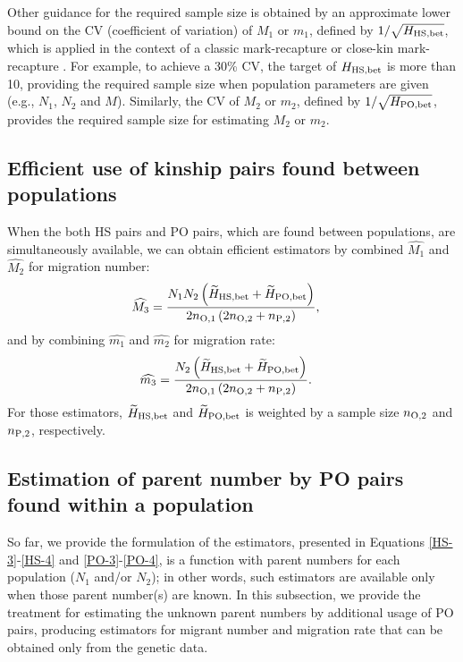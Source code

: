 \documentclass[12pt, English]{article}
\begin{document}
\begin{spacing}{1.9}
Other guidance for the required sample size is obtained by an approximate lower bound on the CV (coefficient of variation) of $M_1$ or $m_1$, defined by $1/\sqrt{H_{\rm HS, bet}}$, which is applied in the context of a classic mark-recapture \cite[]{seber1982estimation} or close-kin mark-recapture \cite[]{bravington2016close}. For example, to achieve a 30\% CV, the target of $H_{\rm HS, bet}$ is more than 10, providing the required sample size when population parameters are given (e.g., $N_1$, $N_2$ and $M$). Similarly, the CV of $M_2$ or $m_2$, defined by $1/\sqrt{H_{\rm PO, bet}}$, provides the required sample size for estimating $M_2$ or $m_2$. 

\subsection{Efficient use of kinship pairs found between populations}

When the both HS pairs and PO pairs, which are found between populations, are simultaneously available, we can obtain efficient estimators by combined $\widehat{M_1}$ and $\widehat{M_2}$ for migration number: 
\begin{align}
\widehat{M_3} &= \frac{ N_{1} N_{2} \left(\widetilde{H}_{\rm HS,bet} + \widetilde{H}_{\rm PO,bet}\right) } {2n_{\rm O, 1} \left(2 n_{\rm O, 2} + n_{\rm P, 2}\right) },
\label{AP-1}
\end{align}
and by combining $\widehat{m_1}$ and $\widehat{m_2}$ for migration rate: 
\begin{align}
\widehat{m_3} &= \frac{ N_{2} \left(\widetilde{H}_{\rm HS,bet} + \widetilde{H}_{\rm PO,bet}\right) } {2n_{\rm O, 1} \left(2 n_{\rm O, 2} + n_{\rm P, 2}\right)}.
\label{AP-2}
\end{align}
For those estimators, $\widetilde{H}_{\rm HS,bet}$ and $\widetilde{H}_{\rm PO,bet}$ is weighted by a sample size $n_{\rm O, 2}$ and $n_{\rm P, 2}$, respectively. 

\subsection{Estimation of parent number by PO pairs found within a population}

So far, we provide the formulation of the estimators, presented in Equations \ref{HS-3}-\ref{HS-4} and \ref{PO-3}-\ref{PO-4}, is a function with parent numbers for each population ($N_1$ and/or $N_2$); in other words, such estimators are available only when those parent number(s) are known. In this subsection, we provide the treatment for estimating the unknown parent numbers by additional usage of PO pairs, producing estimators for migrant number and migration rate that can be obtained only from the genetic data. 


\end{spacing}
\end{document}
